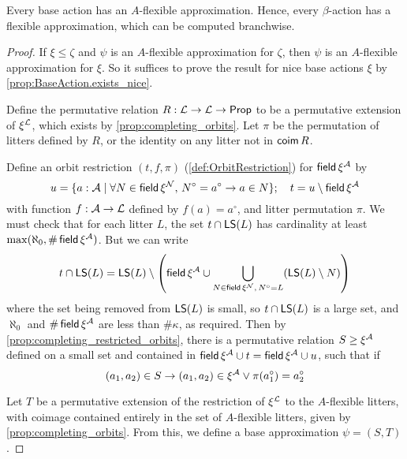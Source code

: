 \begin{proposition}
  \label{prop:exists_flexApprox}
  Every base action has an \( A \)-flexible approximation.
  Hence, every \( \beta \)-action has a flexible approximation, which can be computed branchwise.
\end{proposition}
\begin{proof}
  If \( \xi \leq \zeta \) and \( \psi \) is an \( A \)-flexible approximation for \( \zeta \), then \( \psi \) is an \( A \)-flexible approximation for \( \xi \).
  So it suffices to prove the result for nice base actions \( \xi \) by \cref{prop:BaseAction.exists_nice}.

  Define the permutative relation \( R : {\mathcal L} \to {\mathcal L} \to \mathsf{Prop} \) to be a permutative extension of \( \xi^{\mathcal L} \), which exists by \cref{prop:completing_orbits}.
  Let \( \pi \) be the permutation of litters defined by \( R \), or the identity on any litter not in \( \operatorname{\mathsf{coim}} R \).

  Define an orbit restriction \( (t, f, \pi) \) (\cref{def:OrbitRestriction}) for \( \operatorname{\mathsf{field}} \xi^{\mathcal A} \) by
  \[ u = \{ a : {\mathcal A} \mid \forall N \in \operatorname{\mathsf{field}} \xi^{\mathcal N},\, N^\circ = a^\circ \to a \in N \};\quad t = u \setminus \operatorname{\mathsf{field}} \xi^{\mathcal A} \]
  with function \( f : {\mathcal A} \to {\mathcal L} \) defined by \( f(a) = a^\circ \), and litter permutation \( \pi \).
  We must check that for each litter \( L \), the set \( t \cap \operatorname{\mathsf{LS}}(L) \) has cardinality at least \( \max(\aleph_0, \#\operatorname{\mathsf{field}} \xi^{\mathcal A}) \).
  But we can write
  \[ t \cap \operatorname{\mathsf{LS}}(L) = \operatorname{\mathsf{LS}}(L) \setminus \left( \operatorname{\mathsf{field}} \xi^{\mathcal A} \cup \bigcup_{N \in \operatorname{\mathsf{field}} \xi^{\mathcal N},\, N^\circ = L} (\operatorname{\mathsf{LS}}(L) \setminus N) \right) \]
  where the set being removed from \( \operatorname{\mathsf{LS}}(L) \) is small, so \( t \cap \operatorname{\mathsf{LS}}(L) \) is a large set, and \( \aleph_0 \) and \( \#\operatorname{\mathsf{field}} \xi^{\mathcal A} \) are less than \( \#\kappa \), as required.
  Then by \cref{prop:completing_restricted_orbits}, there is a permutative relation \( S \geq \xi^{\mathcal A} \) defined on a small set and contained in \( \operatorname{\mathsf{field}} \xi^{\mathcal A} \cup t = \operatorname{\mathsf{field}} \xi^{\mathcal A} \cup u \), such that if
  \[ (a_1, a_2) \in S \to (a_1, a_2) \in \xi^{\mathcal A} \vee \pi(a_1^\circ) = a_2^\circ \]

  Let \( T \) be a permutative extension of the restriction of \( \xi^{\mathcal L} \) to the \( A \)-flexible litters, with coimage contained entirely in the set of \( A \)-flexible litters, given by \cref{prop:completing_orbits}.
  From this, we define a base approximation \( \psi = (S, T) \).


\end{proof}

